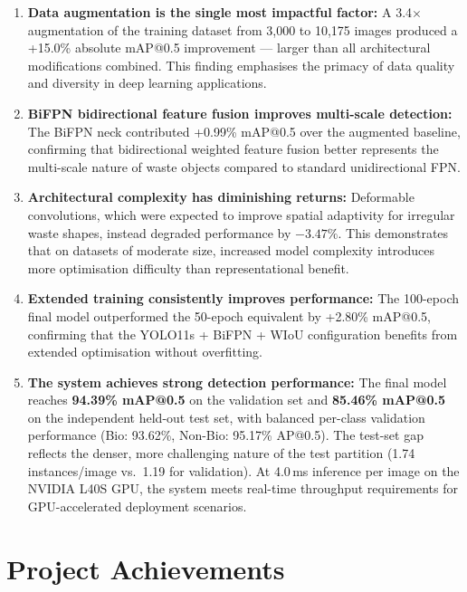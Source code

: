 \begin{enumerate}
    \item \textbf{Data augmentation is the single most impactful factor:} A 3.4$\times$ augmentation of the training dataset from 3,000 to 10,175 images produced a +15.0\% absolute mAP@0.5 improvement — larger than all architectural modifications combined. This finding emphasises the primacy of data quality and diversity in deep learning applications.

    \item \textbf{BiFPN bidirectional feature fusion improves multi-scale detection:} The BiFPN neck contributed +0.99\% mAP@0.5 over the augmented baseline, confirming that bidirectional weighted feature fusion better represents the multi-scale nature of waste objects compared to standard unidirectional FPN.

    \item \textbf{Architectural complexity has diminishing returns:} Deformable convolutions, which were expected to improve spatial adaptivity for irregular waste shapes, instead degraded performance by $-3.47\%$. This demonstrates that on datasets of moderate size, increased model complexity introduces more optimisation difficulty than representational benefit.

    \item \textbf{Extended training consistently improves performance:} The 100-epoch final model outperformed the 50-epoch equivalent by +2.80\% mAP@0.5, confirming that the YOLO11s + BiFPN + WIoU configuration benefits from extended optimisation without overfitting.

    \item \textbf{The system achieves strong detection performance:} The final model reaches \textbf{94.39\% mAP@0.5} on the validation set and \textbf{85.46\% mAP@0.5} on the independent held-out test set, with balanced per-class validation performance (Bio: 93.62\%, Non-Bio: 95.17\% AP@0.5). The test-set gap reflects the denser, more challenging nature of the test partition (1.74 instances/image vs.\ 1.19 for validation). At 4.0\,ms inference per image on the NVIDIA L40S GPU, the system meets real-time throughput requirements for GPU-accelerated deployment scenarios.
\end{enumerate}

\section{Project Achievements}

